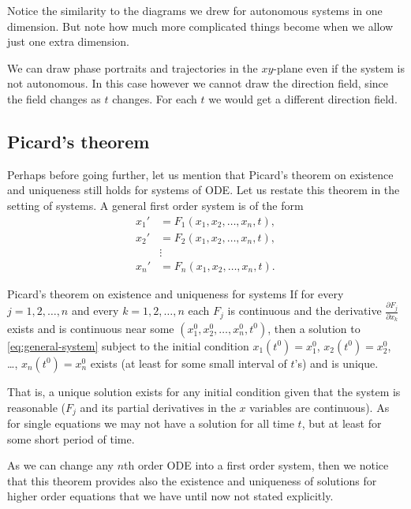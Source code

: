 Notice the similarity to the diagrams we drew for autonomous systems in one
dimension.  But note how much more complicated things become when we
allow just one extra dimension.

We can draw phase portraits and trajectories in the $xy$-plane
even if the system is not autonomous.  In this case however we cannot draw
the direction field, since the field changes as $t$ changes.  For
each $t$ we would get a different direction field.

\subsection{Picard's theorem}

Perhaps before going further, let us mention that Picard's theorem on
existence and uniqueness still holds for systems of ODE\@.  Let us restate
this theorem in the setting of systems.  A general first order
system is of the form
\begin{equation} \label{eq:general-system}
\begin{aligned}
x_1' & = F_1(x_1,x_2,\ldots,x_n,t) , \\
x_2' & = F_2(x_1,x_2,\ldots,x_n,t) , \\
& \vdots \\
x_n' & = F_n(x_1,x_2,\ldots,x_n,t) .
\end{aligned}
\end{equation}

\begin{theorem1}{Picard's theorem on existence and uniqueness for systems}%
%
If for every $j=1,2,\ldots,n$ and every
$k = 1,2,\ldots,n$
each $F_j$ is continuous
and the derivative
$\frac{\partial F_j}{\partial x_k}$ exists and is
continuous near some $(x_1^0,x_2^0,\ldots,x_n^0,t^0)$, then a solution to
\eqref{eq:general-system}
subject to the initial condition
$x_1(t^0) = x_1^0$,
$x_2(t^0) = x_2^0$, \ldots,
$x_n(t^0) = x_n^0$
exists (at least for some small interval of $t$'s) and is unique.
\end{theorem1}

That is, a unique solution exists for any initial condition
given that the system is reasonable ($F_j$ and its partial derivatives
in the $x$ variables are continuous).  As for single equations
we may not have a solution for all time $t$, but at least for some 
short period of time.

As we can change any $n$th order ODE into a first order system,
then we notice that this theorem provides also the
existence and uniqueness of solutions for higher order equations
that we have until now not stated explicitly.


